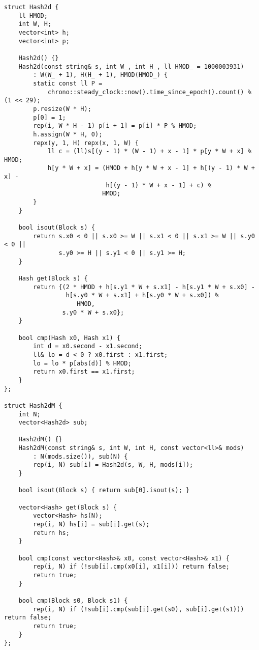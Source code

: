 \documentclass[twoside]{article}
\begin{document}
\begin{multicols*}{2}
\begin{verbatim}
struct Hash2d {
    ll HMOD;
    int W, H;
    vector<int> h;
    vector<int> p;

    Hash2d() {}
    Hash2d(const string& s, int W_, int H_, ll HMOD_ = 1000003931)
        : W(W_ + 1), H(H_ + 1), HMOD(HMOD_) {
        static const ll P =
            chrono::steady_clock::now().time_since_epoch().count() % (1 << 29);
        p.resize(W * H);
        p[0] = 1;
        rep(i, W * H - 1) p[i + 1] = p[i] * P % HMOD;
        h.assign(W * H, 0);
        repx(y, 1, H) repx(x, 1, W) {
            ll c = (ll)s[(y - 1) * (W - 1) + x - 1] * p[y * W + x] % HMOD;
            h[y * W + x] = (HMOD + h[y * W + x - 1] + h[(y - 1) * W + x] -
                            h[(y - 1) * W + x - 1] + c) %
                           HMOD;
        }
    }

    bool isout(Block s) {
        return s.x0 < 0 || s.x0 >= W || s.x1 < 0 || s.x1 >= W || s.y0 < 0 ||
               s.y0 >= H || s.y1 < 0 || s.y1 >= H;
    }

    Hash get(Block s) {
        return {(2 * HMOD + h[s.y1 * W + s.x1] - h[s.y1 * W + s.x0] -
                 h[s.y0 * W + s.x1] + h[s.y0 * W + s.x0]) %
                    HMOD,
                s.y0 * W + s.x0};
    }

    bool cmp(Hash x0, Hash x1) {
        int d = x0.second - x1.second;
        ll& lo = d < 0 ? x0.first : x1.first;
        lo = lo * p[abs(d)] % HMOD;
        return x0.first == x1.first;
    }
};

struct Hash2dM {
    int N;
    vector<Hash2d> sub;

    Hash2dM() {}
    Hash2dM(const string& s, int W, int H, const vector<ll>& mods)
        : N(mods.size()), sub(N) {
        rep(i, N) sub[i] = Hash2d(s, W, H, mods[i]);
    }

    bool isout(Block s) { return sub[0].isout(s); }

    vector<Hash> get(Block s) {
        vector<Hash> hs(N);
        rep(i, N) hs[i] = sub[i].get(s);
        return hs;
    }

    bool cmp(const vector<Hash>& x0, const vector<Hash>& x1) {
        rep(i, N) if (!sub[i].cmp(x0[i], x1[i])) return false;
        return true;
    }

    bool cmp(Block s0, Block s1) {
        rep(i, N) if (!sub[i].cmp(sub[i].get(s0), sub[i].get(s1))) return false;
        return true;
    }
};
\end{verbatim}

{
}
\end{multicols*}
\end{document}

